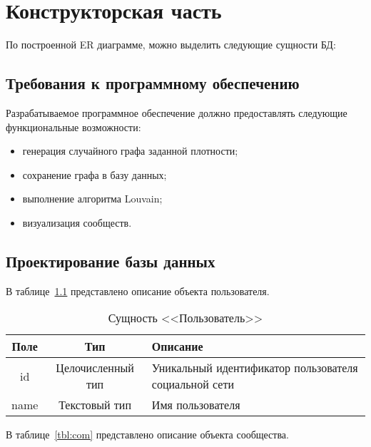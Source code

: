 \chapter{Конструкторская часть}

По построенной ER диаграмме, можно выделить следующие сущности БД:

\section{Требования к программному обеспечению}

Разрабатываемое программное обеспечение должно предоставлять
следующие функциональные возможности:

\begin{itemize}
  \item генерация случайного графа заданной плотности;
  \item сохранение графа в базу данных;
  \item выполнение алгоритма Louvain;
  \item визуализация сообществ.
\end{itemize}


\section{Проектирование базы данных}

В таблице~\ref{tbl:usr} представлено описание объекта пользователя.

\begin{table}[H]
	\begin{center}
		\begin{threeparttable}
			\caption{Сущность <<Пользователь>>}
			\label{tbl:usr}
			\begin{tabularx}{\textwidth}{|c|c|X|}
			\hline
			\textbf{Поле} & \textbf{Тип} & \textbf{Описание} \\
			\hline
			id & Целочисленный тип & Уникальный идентификатор пользователя социальной сети \\
			\hline
			name & Текстовый тип & Имя пользователя \\
			\hline
			\end{tabularx}
		\end{threeparttable}
	\end{center}
\end{table}

В таблице~\ref{tbl:com} представлено описание объекта сообщества.

